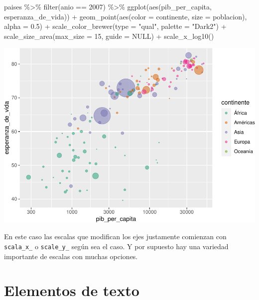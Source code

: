 \documentclass[
  openany]{book}
\newenvironment{Shaded}{\begin{snugshade}}{\end{snugshade}}
\newcommand{\AttributeTok}[1]{\textcolor[rgb]{0.77,0.63,0.00}{#1}}
\newcommand{\ConstantTok}[1]{\textcolor[rgb]{0.00,0.00,0.00}{#1}}
\newcommand{\DecValTok}[1]{\textcolor[rgb]{0.00,0.00,0.81}{#1}}
\newcommand{\FloatTok}[1]{\textcolor[rgb]{0.00,0.00,0.81}{#1}}
\newcommand{\FunctionTok}[1]{\textcolor[rgb]{0.00,0.00,0.00}{#1}}
\newcommand{\NormalTok}[1]{#1}
\newcommand{\SpecialCharTok}[1]{\textcolor[rgb]{0.00,0.00,0.00}{#1}}
\newcommand{\StringTok}[1]{\textcolor[rgb]{0.31,0.60,0.02}{#1}}
\begin{document}
\begin{Shaded}
\begin{Highlighting}[]
\NormalTok{paises }\SpecialCharTok{\%\textgreater{}\%} 
  \FunctionTok{filter}\NormalTok{(anio }\SpecialCharTok{==} \DecValTok{2007}\NormalTok{) }\SpecialCharTok{\%\textgreater{}\%} 
  \FunctionTok{ggplot}\NormalTok{(}\FunctionTok{aes}\NormalTok{(pib\_per\_capita, esperanza\_de\_vida)) }\SpecialCharTok{+}
  \FunctionTok{geom\_point}\NormalTok{(}\FunctionTok{aes}\NormalTok{(}\AttributeTok{color =}\NormalTok{ continente, }\AttributeTok{size =}\NormalTok{ poblacion), }\AttributeTok{alpha =} \FloatTok{0.5}\NormalTok{) }\SpecialCharTok{+}
  \FunctionTok{scale\_color\_brewer}\NormalTok{(}\AttributeTok{type =} \StringTok{"qual"}\NormalTok{, }\AttributeTok{palette =} \StringTok{"Dark2"}\NormalTok{) }\SpecialCharTok{+}
  \FunctionTok{scale\_size\_area}\NormalTok{(}\AttributeTok{max\_size =} \DecValTok{15}\NormalTok{, }\AttributeTok{guide =} \ConstantTok{NULL}\NormalTok{) }\SpecialCharTok{+}
  \FunctionTok{scale\_x\_log10}\NormalTok{()}
\end{Highlighting}
\end{Shaded}

\begin{center}\includegraphics[width=1\linewidth]{DT6_files/figure-latex/unnamed-chunk-134-1} \end{center}

En este caso las escalas que modifican los ejes justamente comienzan con \texttt{scala\_x\_} o \texttt{scale\_y\_} según sea el caso.
Y por supuesto hay una variedad importante de escalas con muchas opciones.

\hypertarget{elementos-de-texto}{%
\section{Elementos de texto}\label{elementos-de-texto}}
\end{document}
